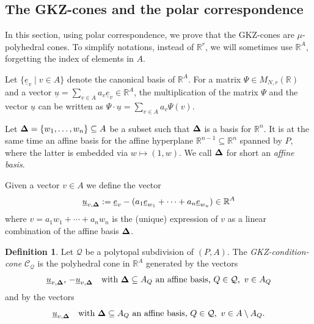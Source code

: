 \documentclass[12pt, a4article]{amsart}   	%
\numberwithin{equation}{section}
\theoremstyle{plain}
\theoremstyle{definition}
\newtheorem{definition}[theorem]{Definition}
\newcommand{\R}{{\mathbb R}}
\newcommand{\bfDelta}{{\bf \Delta}}
\newcommand{\mcC}{{\mathcal C}}
\newcommand{\mcQ}{{\mathcal Q}}
\newcommand{\ue}{{\underline e}}
\newcommand{\uu}{{\underline u}}
\newcommand{\MNaR}{M_{N,r}(\R)}
\begin{document}
\subsection{The GKZ-cones and the polar correspondence}

In this section, using polar correspondence, we prove that the GKZ-cones are $\mu$-polyhedral cones. To simplify notations, instead of $\mathbb{R}^r$, we will sometimes use $\mathbb{R}^A$, forgetting the index of elements in $A$.

Let $\{\ue_v\mid v\in A\}$ denote the canonical basis of $\R^A$. For a matrix $\Psi\in\MNaR$ and a vector 
$\uu = \sum_{v\in A}a_v\ue_v\in\R^A$, the multiplication of the matrix $\Psi$ and the vector $\uu$ can be written as $\Psi\cdot\uu = \sum_{v\in A}a_v\Psi(v)$.

Let $\bfDelta = \{w_1,\ldots,w_n\}\subseteq A$ be a subset such that $\bfDelta$ is a basis for $\mathbb R^n$. It is at the same time an affine basis for the affine hyperplane $\R^{n-1}\subseteq \R^n$ spanned by $P$, where the latter is embedded via $w\mapsto (1,w)$. We call $\bfDelta$ for short an \emph{affine basis}. 

Given a vector $v\in A$ we define the vector
$$\uu_{v,\bfDelta} := \ue_v - (a_1\ue_{w_1} + \cdots + a_n\ue_{w_n}) \in \R^A$$
where $v = a_1w_1 + \cdots + a_nw_n$ is the (unique) expression of $v$ as a linear combination of the affine basis $\bfDelta$.


\begin{definition}\label{def:condition:cone}
Let $\mcQ$ be a polytopal subdivision of $(P,A)$. The \emph{GKZ-condition-cone} $\mcC_\mcQ$ is the polyhedral cone in $\R^A$ generated by the vectors
$$\uu_{v,\bfDelta},\,-\uu_{v,\bfDelta}\quad\textrm{with }\bfDelta\subseteq A_Q\textrm{ an affine basis, }Q\in \mcQ,\,\, v\in A_Q$$
and by the vectors
$$\uu_{v,\bfDelta}\quad\textrm{with }\bfDelta\subseteq A_Q\text{ an affine basis, }Q\in \mcQ,\,\,  v\in A\setminus A_Q.$$
\end{definition}
\end{document}
